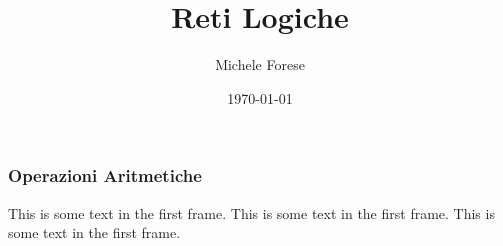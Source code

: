 \documentclass{beamer}
\title{Reti Logiche}
\author{Michele Forese}
\institute{ACME}
\date{\today}
\begin{document}
\frame{\titlepage}

\begin{frame}
  \frametitle{Operazioni Aritmetiche}

  This is some text in the first frame. This is some text in the first frame. This is some text in the first frame.
\end{frame}
\end{document}
